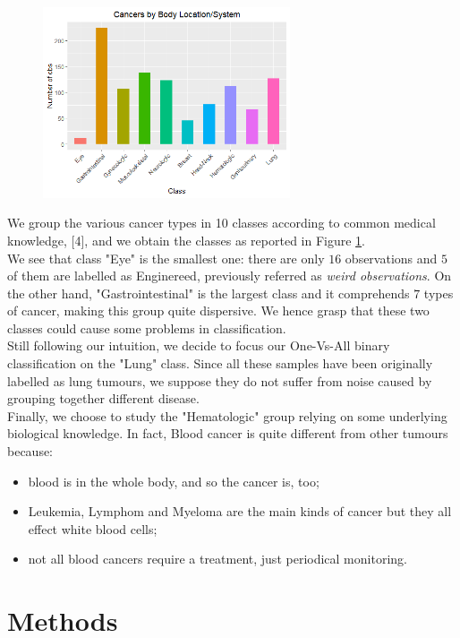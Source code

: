 \documentclass[a4paper,11pt, oneside]{article}  %
\begin{document}
\begin{figure}
	\includegraphics[width=0.65\textwidth]{Rplot-classes.png}
	\label{fig1}
\end{figure}
We group the various cancer types in 10 classes according to common medical knowledge, [4], and we obtain the classes as reported in Figure \ref{fig1}. \\
We see that class "Eye" is the smallest one: there are only $16$ observations and $5$ of them are labelled as Enginereed, previously referred as \textit{weird observations}. On the other hand, "Gastrointestinal" is the largest class and it comprehends $7$ types of cancer, making this group quite dispersive. We hence grasp that these two classes could cause some problems in classification. \\
Still following our intuition, we decide to focus our One-Vs-All binary classification on the "Lung" class. Since all these samples have been originally labelled as lung tumours, we suppose they do not suffer from noise caused by grouping together different disease. \\
Finally, we choose to study the "Hematologic" group relying on some underlying biological knowledge. In fact, Blood cancer is quite different from other tumours because:
\begin{itemize}
	\item blood is in the whole body, and so the cancer is, too;
	\item Leukemia, Lymphom and Myeloma are the main kinds of cancer but they all effect white blood cells;
	\item not all blood cancers require a treatment, just periodical monitoring.
\end{itemize} 


\section{Methods}
\end{document}

